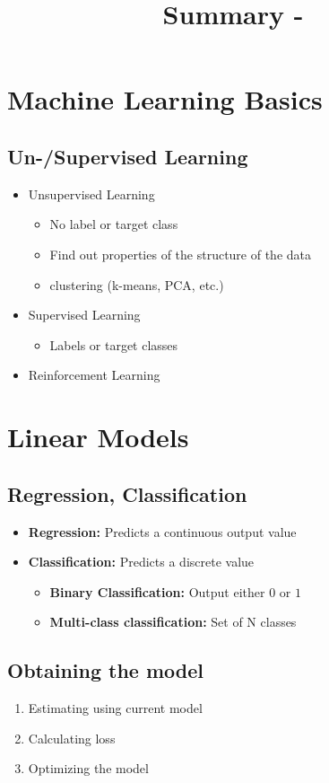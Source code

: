 \documentclass[10pt,a4paper]{article}
\title{Summary - \lecture}
\author{}
\date{}
\begin{document}
\tableofcontents
\pagebreak

\section{Machine Learning Basics}
\subsection{Un-/Supervised Learning}
\begin{itemize}
	\item Unsupervised Learning
	\begin{itemize}
		\item No label or target class
		\item Find out properties of the structure of the data
		\item clustering (k-means, PCA, etc.)
	\end{itemize}
	\item Supervised Learning
	\begin{itemize}
		\item Labels or target classes
	\end{itemize}
	\item Reinforcement Learning
\end{itemize}

\pagebreak
\section{Linear Models}
\subsection{Regression, Classification}
\begin{itemize}
	\item \textbf{Regression:} Predicts a continuous output value
	\item \textbf{Classification:} Predicts a discrete value
	\begin{itemize}
		\item \textbf{Binary Classification:} Output either $0$ or $1$
		\item \textbf{Multi-class classification:} Set of N classes
	\end{itemize}
\end{itemize}

\subsection{Obtaining the model}
\begin{enumerate}
	\item Estimating using current model
	\item Calculating loss
	\item Optimizing the model
\end{enumerate}
\end{document}

